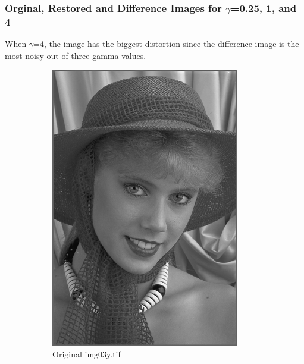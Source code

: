 \documentclass{article}
\begin{document}
		\subsubsection{Orginal, Restored and Difference Images for $\gamma$=0.25, 1, and 4}
			When $\gamma$=4, the image has the biggest distortion since the difference
			image is the most noisy out of three gamma values.
			\begin{figure}[!htb]
				\begin{subfigure}{0.3\textwidth}
					\includegraphics[width=0.9\textwidth]{img03y.png}
					\caption{Original img03y.tif}
				\end{subfigure}
				\begin{subfigure}{0.3\textwidth}

\end{subfigure}
\end{figure}
\end{document}

